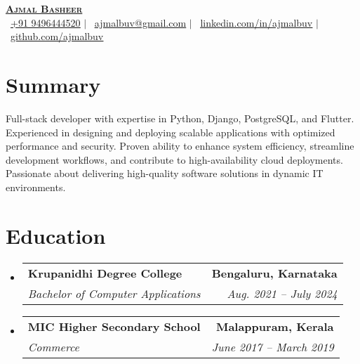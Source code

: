 \documentclass[a4paper,11pt]{article}
\makeatletter
\newcommand{\resumeSubheading}[4]{
	\vspace{-2pt}\item
		\begin{tabular*}{0.97\textwidth}[t]{l@{\extracolsep{\fill}}r}
			\textbf{#1} & \textbf{\small #2} \\
			\textit{\small#3} & \textit{\small #4} \\
		\end{tabular*}\vspace{-7pt}
}
\newcommand{\resumeSubHeadingListStart}{\begin{itemize}[leftmargin=0.15in, label={}]}
\newcommand{\resumeSubHeadingListEnd}{\end{itemize}}
\makeatother
\begin{document}
\begin{center}
	{\selectfont \textbf{\Huge \scshape \href{https://ajmalbuv.github.io}{Ajmal Basheer}}} \\ \vspace{1pt}
	\small{
		\raisebox{-0.1\height}\faPhone\ \href{tel:+919496444520}{\underline{+91 9496444520}} $|$
		\raisebox{-0.2\height}\faEnvelope\ \href{mailto:ajmalbuv@gmail.com}{\underline{ajmalbuv@gmail.com}} $|$
		\raisebox{-0.2\height}\faLinkedin\ \href{https://linkedin.com/in/ajmalbuv}{\underline{linkedin.com/in/ajmalbuv}} $|$
		\raisebox{-0.2\height}\faGithub\ \href{https://github.com/ajmalbuv}{\underline{github.com/ajmalbuv}}
	}
\end{center}

\section{Summary}
\begin{itemize}[leftmargin=0.15in, label={}]
	\small{\item{
				Full-stack developer with expertise in Python, Django, PostgreSQL, and Flutter. Experienced in designing and deploying scalable applications with optimized performance and security. Proven ability to enhance system efficiency, streamline development workflows, and contribute to high-availability cloud deployments. Passionate about delivering high-quality software solutions in dynamic IT environments.
				}}
\end{itemize}
\section{Education}
\resumeSubHeadingListStart
\resumeSubheading
{Krupanidhi Degree College}{Bengaluru, Karnataka}
{Bachelor of Computer Applications}{Aug. 2021 -- July 2024}
\resumeSubheading
{MIC Higher Secondary School}{Malappuram, Kerala}
{Commerce}{June 2017 -- March 2019}
\resumeSubHeadingListEnd

\end{document}
